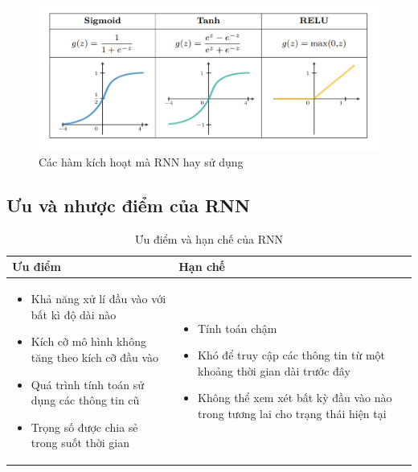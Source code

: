 \begin{figure}[h!]
    \centering
    \includegraphics[width=\textwidth]{images/activation.png}
    \caption{Các hàm kích hoạt mà RNN hay sử dụng}
    \label{fig:activation_functions}
\end{figure}

\subsection{Ưu và nhược điểm của RNN}

\begin{table}[h]
    \centering
    \renewcommand{\arraystretch}{1} %
    \begin{tabular}{|p{7.5cm}|p{7.5cm}|}
        \hline
        \textbf{Ưu điểm} & \textbf{Hạn chế} \\ \hline
        \begin{itemize}
            \item Khả năng xử lí đầu vào với bất kì độ dài nào
            \item Kích cỡ mô hình không tăng theo kích cỡ đầu vào
            \item Quá trình tính toán sử dụng các thông tin cũ
            \item Trọng số được chia sẻ trong suốt thời gian
        \end{itemize} 
        & 
        \begin{itemize}
            \item Tính toán chậm
            \item Khó để truy cập các thông tin từ một khoảng thời gian dài trước đây
            \item Không thể xem xét bất kỳ đầu vào nào trong tương lai cho trạng thái hiện tại
        \end{itemize} \\ \hline
    \end{tabular}
    \caption{Ưu điểm và hạn chế của RNN}
    \label{tab:uudiem_hanche}
\end{table}

